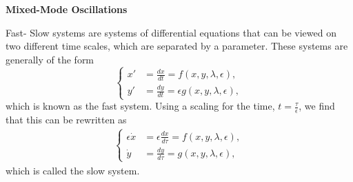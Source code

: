 \documentclass[15pt, a0paper, portrait]{tikzposter}
\begin{document}
\block{~}
{\textbf{Mixed-Mode Oscillations}\centering
	
	Fast- Slow systems are systems of differential equations that can be viewed on two different time scales, which are separated by a parameter.
	These systems are generally of the form
	\begin{equation*} 
	\begin{cases}
	x' &=\frac{dx}{dt}= f(x,y,\lambda, \epsilon),\\
	y' &= \frac{dy}{dt}= \epsilon g( x,y, \lambda, \epsilon),
	\end{cases}\label{FastS}
	\end{equation*}
	which is known as the fast system.
	Using a scaling for the time, $t = \frac{\tau}{\epsilon} $, we find that this can be rewritten as
	\begin{align*}
	\begin{cases}
	\epsilon \dot{x} &= \epsilon \frac{dx}{d \tau} = f(x,y,\lambda, \epsilon),\\
	\dot{y} & = \frac{dy}{d \tau} =  g( x,y, \lambda, \epsilon),
	\end{cases}\label{SlowS}
	\end{align*}
	which is called the slow system.
}
\end{document}
